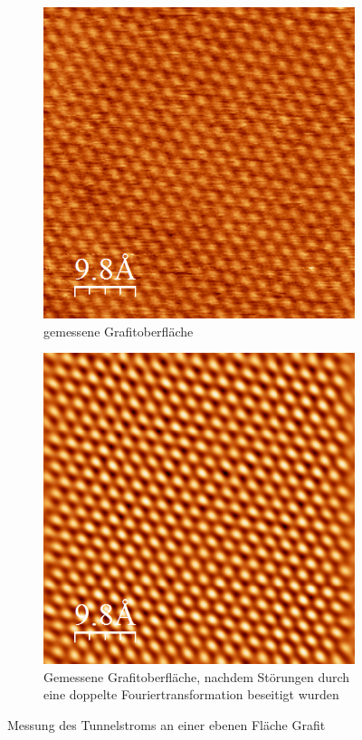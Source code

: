 \documentclass[10pt,a4paper]{article}
\begin{document}
\begin{figure}[h]
	\centering
	\begin{subfigure}{0.45\textwidth}
		\centering
		\includegraphics[width=\textwidth]{vor_doppelter_fourier.png}
		\caption{gemessene Grafitoberfläche}
		\label{grafob1}
	\end{subfigure}
	\begin{subfigure}{0.45\textwidth}
		\centering
		\includegraphics[width=\textwidth]{nach_doppelter_fourier.png}
		\caption{Gemessene Grafitoberfläche, nachdem Störungen durch eine doppelte Fouriertransformation beseitigt wurden}
		\label{grafob2}
	\end{subfigure}

	\caption{Messung des Tunnelstroms an einer ebenen Fläche Grafit}
	\label{Grafitoberflächenebene}
\end{figure}
\end{document}
